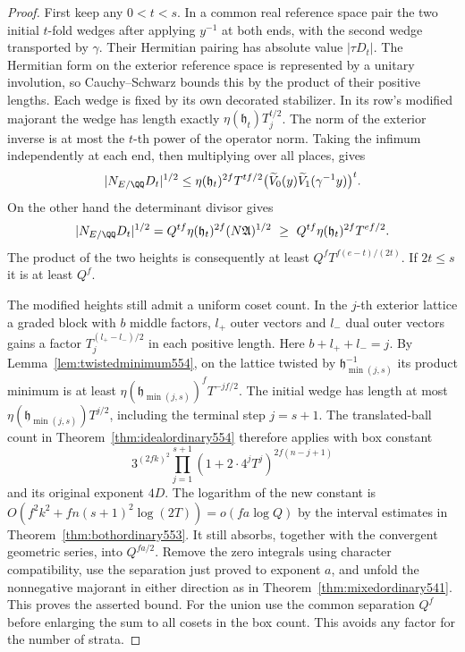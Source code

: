 \documentclass[a4paper,11pt]{article}
\theoremstyle{definition}
\theoremstyle{remark}
\numberwithin{equation}{section}
\begin{document}
\begin{proof}
First keep any \(0<t<s\). In a common real reference space
pair the two initial \(t\)-fold wedges after applying \(y^{-1}\)
at both ends, with the second wedge transported by \(\gamma\).
Their Hermitian pairing has absolute value \(|\tau D_t|\).
The Hermitian form on the exterior reference space is represented
by a unitary involution, so Cauchy--Schwarz bounds this by the
product of their positive lengths. Each wedge is fixed by its
own decorated stabilizer. In its row's modified majorant the
wedge has length exactly
\(\eta(\mathfrak h_t)T_j^{t/2}\).
The norm of the exterior inverse is at most the \(t\)-th
power of the operator norm. Taking the infimum independently
at each end, then multiplying over all places, gives
\[
 |N_{E/\QQ}D_t|^{1/2}
 \le \eta(\mathfrak h_t)^{2f} T^{tf/2}
      \big(\widetilde V_0(y)\widetilde V_1(\gamma^{-1}y)\big)^t .
\]
On the other hand the determinant divisor gives
\[
 |N_{E/\QQ}D_t|^{1/2}
 =Q^{tf}\eta(\mathfrak h_t)^{2f}(N\mathfrak A)^{1/2}
 \ \ge\ Q^{tf}\eta(\mathfrak h_t)^{2f}T^{ef/2}.
\]
The product of the two heights is consequently at least
\(Q^f T^{f(e-t)/(2t)}\). If \(2t\le s\) it is at least \(Q^f\).

The modified heights still admit a uniform coset count.
In the \(j\)-th exterior lattice a graded block with \(b\)
middle factors, \(l_+\) outer vectors and \(l_-\) dual outer
vectors gains a factor \(T_j^{(l_+-l_-)/2}\) in each positive
length. Here \(b+l_++l_-=j\). By Lemma~\ref{lem:twistedminimum554},
on the lattice twisted by
\(\mathfrak h_{\min(j,s)}^{-1}\) its product minimum is at least
\(\eta(\mathfrak h_{\min(j,s)})^f T^{-jf/2}\).
The initial wedge has length at most
\(\eta(\mathfrak h_{\min(j,s)})T^{j/2}\), including the terminal
step \(j=s+1\). The translated-ball count in
Theorem~\ref{thm:idealordinary554} therefore applies with box
constant
\[
  3^{(2fk)^2}\prod_{j=1}^{s+1}
                  (1+2\cdot4^j T^j)^{2f(n-j+1)}
\]
and its original exponent \(4D\). The logarithm of the new
constant is \(O(f^2k^2+fn(s+1)^2\log(2T))=o(fa\log Q)\)
by the interval estimates in Theorem~\ref{thm:bothordinary553}.
It still absorbs, together with the convergent geometric
series, into \(Q^{fa/2}\). Remove the zero integrals using
character compatibility, use the separation just proved
to exponent \(a\), and unfold the nonnegative majorant in
either direction as in Theorem~\ref{thm:mixedordinary541}.
This proves the asserted bound. For the union use the common
separation \(Q^f\) before enlarging the sum to all cosets in
the box count. This avoids any factor for the number of strata.


\end{proof}
\end{document}
